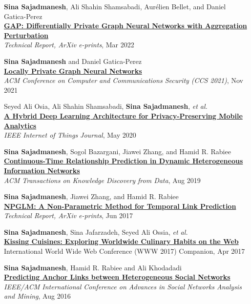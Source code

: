 \documentclass[8pt]{article}
\begin{document}
\begin{bibenum}
	\item{} \textbf{Sina Sajadmanesh}, Ali Shahin Shamsabadi, Aurélien Bellet, and Daniel Gatica-Perez\\
	\href{https://arxiv.org/abs/2203.00949}{\textbf{GAP: Differentially Private Graph Neural Networks with Aggregation Perturbation}}\\
	\textit{Technical Report, ArXiv e-prints}, Mar 2022

	\item{} \textbf{Sina Sajadmanesh} and Daniel Gatica-Perez\\
	\href{https://arxiv.org/abs/2006.05535}{\textbf{Locally Private Graph Neural Networks}}\\
	\textit{ACM Conference on Computer and Communications Security (CCS 2021)}, Nov 2021

	\item{} Seyed Ali Osia, Ali Shahin Shamsabadi, \textbf{Sina Sajadmanesh}, \textit{et al.}\\
	\href{https://arxiv.org/abs/1703.02952}{\textbf{A Hybrid Deep Learning Architecture for Privacy-Preserving Mobile Analytics}}\\
	\textit{IEEE Internet of Things Journal}, May 2020
	
	\item{} \textbf{Sina Sajadmanesh}, Sogol Bazargani, Jiawei Zhang, and Hamid R. Rabiee\\
	\href{https://arxiv.org/abs/1710.00818}{\textbf{Continuous-Time Relationship Prediction in Dynamic Heterogeneous Information Networks}}\\
	\textit{ACM Transactions on Knowledge Discovery from Data}, Aug 2019
	
	\item{} \textbf{Sina Sajadmanesh}, Jiawei Zhang, and Hamid R. Rabiee\\
	\href{https://arxiv.org/abs/1706.06783}{\textbf{NPGLM: A Non-Parametric Method for Temporal Link Prediction}}\\
	\textit{Technical Report, ArXiv e-prints}, Jun 2017
	
	\item{} \textbf{Sina Sajadmanesh}, Sina Jafarzadeh, Seyed Ali Ossia, \textit{et al.}\\
	\href{https://arxiv.org/pdf/1610.08469}{\textbf{Kissing Cuisines: Exploring Worldwide Culinary Habits on the Web}}\\
	International World Wide Web Conference (WWW 2017) Companion, Apr 2017
	
	\item{} \textbf{Sina Sajadmanesh}, Hamid R. Rabiee and Ali Khodadadi\\
	\href{https://arxiv.org/pdf/1607.08821}{\textbf{Predicting Anchor Links between Heterogeneous Social Networks}}\\
	\textit{IEEE/ACM International Conference on Advances in Social Networks Analysis and Mining},  Aug 2016
	
\end{bibenum}
\end{document}
